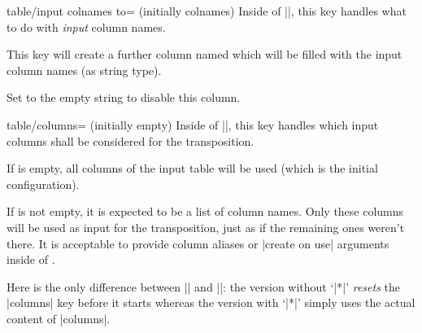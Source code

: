 \begin{commandlist}
    \begin{pgfplotskey}{table/input colnames to= (initially colnames)}
        Inside of |\pgfplotstabletranspose|, this key handles what to do with
        \emph{input} column names.

        This key will create a further column named  which will be
        filled with the input column names (as string type).
\begin{codeexample}[pre={\begin{lateximage}},post={\end{lateximage}}]
\pgfplotstabletranspose[input colnames to=Input]
\loadedtable
\end{codeexample}
        Set  to the empty string to disable this column.
\begin{codeexample}[pre={\begin{lateximage}},post={\end{lateximage}}]
\pgfplotstabletranspose[input colnames to=]
\loadedtable
\end{codeexample}
    \end{pgfplotskey}

    \begin{pgfplotskey}{table/columns= (initially empty)}
        Inside of |\pgfplotstabletranspose|, this key handles which input
        columns shall be considered for the transposition.

        If  is empty, all columns of the input table will be used
        (which is the initial configuration).

        If  is not empty, it is expected to be a list of column
        names. Only these columns will be used as input for the transposition,
        just as if the remaining ones weren't there. It is acceptable to
        provide column aliases or |create on use| arguments inside of
        .
\begin{codeexample}[pre={\begin{lateximage}},post={\end{lateximage}}]
\pgfplotstabletranspose[columns={a,b}]
\loadedtable
\end{codeexample}

        Here is the only difference between |\pgfplotstabletranspose| and
        |\pgfplotstabletranspose*|: the version without `|*|' \emph{resets} the
        |columns| key before it starts whereas the version with `|*|' simply
        uses the actual content of |columns|.
    \end{pgfplotskey}
\end{commandlist}

